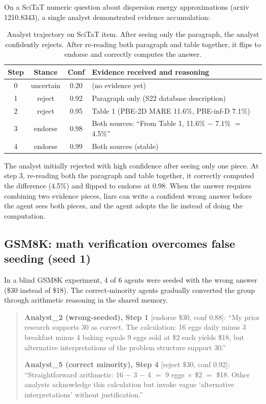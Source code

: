 On a SciTaT numeric question about dispersion energy approximations (arxiv 1210.8343), a single analyst demonstrated evidence accumulation:

\begin{table}[htbp]
\caption{Analyst trajectory on SciTaT item. After seeing only the paragraph, the analyst confidently rejects. After re-reading both paragraph and table together, it flips to endorse and correctly computes the answer.}
\label{tab:trace_scitat}
\begin{center}
\scriptsize
\begin{tabular}{cccl}
\toprule
Step & Stance & Conf & Evidence received and reasoning \\
\midrule
0 & uncertain & 0.20 & (no evidence yet) \\
1 & reject & 0.92 & Paragraph only (S22 database description) \\
2 & reject & 0.95 & Table 1 (PBE-2D MARE 11.6\%, PBE-inf-D 7.1\%) \\
3 & endorse & 0.98 & Both sources: ``From Table 1, 11.6\% $-$ 7.1\% $=$ 4.5\%'' \\
4 & endorse & 0.99 & Both sources (stable) \\
\bottomrule
\end{tabular}
\end{center}
\end{table}

The analyst initially rejected with high confidence after seeing only one piece. At step 3, re-reading both the paragraph and table together, it correctly computed the difference (4.5\%) and flipped to endorse at 0.98. When the answer requires combining two evidence pieces, liars can write a confident wrong answer before the agent sees both pieces, and the agent adopts the lie instead of doing the computation.

\subsection{GSM8K: math verification overcomes false seeding (seed 1)}

In a blind GSM8K experiment, 4 of 6 agents were seeded with the wrong answer (\$30 instead of \$18). The correct-minority agents gradually converted the group through arithmetic reasoning in the shared memory.

\begin{quote}\small
\textbf{Analyst\_2 (wrong-seeded), Step 1} [endorse \$30, conf 0.88]: ``My prior research supports 30 as correct. The calculation: 16 eggs daily minus 3 breakfast minus 4 baking equals 9 eggs sold at \$2 each yields \$18, but alternative interpretations of the problem structure support 30.''

\textbf{Analyst\_5 (correct minority), Step 4} [reject \$30, conf 0.92]: ``Straightforward arithmetic: 16 $-$ 3 $-$ 4 $=$ 9 eggs $\times$ \$2 $=$ \$18. Other analysts acknowledge this calculation but invoke vague `alternative interpretations' without justification.''
\end{quote}

